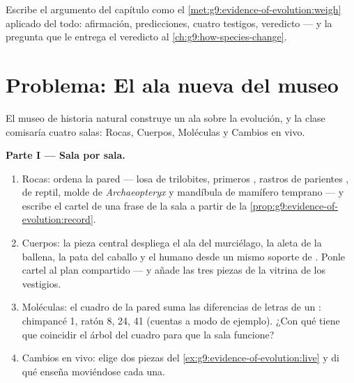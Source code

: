 \begin{exercise}[$\star\star\star$]\label{exo:g9:evidence-of-evolution:12}
Escribe el argumento del capítulo como el
\cref{met:g9:evidence-of-evolution:weigh} aplicado del todo:
afirmación, predicciones, cuatro testigos, veredicto --- y la pregunta
que le entrega el veredicto al \cref{ch:g9:how-species-change}.
\end{exercise}

\section{Problema: El ala nueva del museo}

\begin{problem}\label{pb:g9:evidence-of-evolution:1}
El museo de historia natural construye un ala sobre la evolución, y la
clase comisaría cuatro salas: Rocas, Cuerpos, Moléculas y Cambios en
vivo.

\medskip\noindent\textbf{Parte I --- Sala por sala.}
\begin{enumerate}
  \item Rocas: ordena la pared --- losa de trilobites, primeros ,
        rastros de parientes ,  de reptil, molde de
        \emph{Archaeopteryx} y mandíbula de mamífero temprano --- y
        escribe el cartel de una frase de la sala a partir de la
        \cref{prop:g9:evidence-of-evolution:record}.
  \item Cuerpos: la pieza central despliega el ala del murciélago, la
        aleta de la ballena, la pata del caballo y el  humano
        desde un mismo soporte de . Ponle cartel al plan
        compartido --- y añade las tres piezas de la vitrina de los
        vestigios.
  \item Moléculas: el cuadro de la pared suma las diferencias de letras
        de un : chimpancé 1, ratón 8,  24,  41 (cuentas a
        modo de ejemplo). ¿Con qué tiene que coincidir el árbol del
        cuadro para que la sala funcione?
  \item Cambios en vivo: elige dos piezas del
        \cref{ex:g9:evidence-of-evolution:live} y di qué enseña
        moviéndose cada una.
\end{enumerate}


\end{problem}
